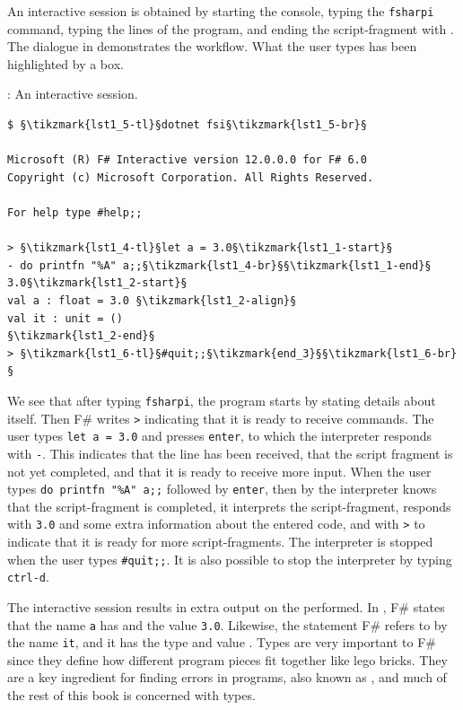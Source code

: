 \documentclass[springer.tex]{subfiles}
\begin{document}
An interactive session is obtained by starting the console, typing the \lstinline[language=console]{fsharpi} command, typing the lines of the program, and ending the script-fragment with \lexeme{;;}. The dialogue in  demonstrates the workflow. What the user types has been highlighted by a box.
%
\begin{codeNOutput}[label=interactiveSession,
  top=-5pt,
  bottom=-5pt,
  left=-2pt,
  right=-2pt,
]{: An interactive session.}
  \begin{lstlisting}[language=console,escapechar=§]
$ §\tikzmark{lst1_5-tl}§dotnet fsi§\tikzmark{lst1_5-br}§

Microsoft (R) F# Interactive version 12.0.0.0 for F# 6.0
Copyright (c) Microsoft Corporation. All Rights Reserved.

For help type #help;;

> §\tikzmark{lst1_4-tl}§let a = 3.0§\tikzmark{lst1_1-start}§
- do printfn "%A" a;;§\tikzmark{lst1_4-br}§§\tikzmark{lst1_1-end}§
3.0§\tikzmark{lst1_2-start}§
val a : float = 3.0 §\tikzmark{lst1_2-align}§
val it : unit = ()
§\tikzmark{lst1_2-end}§
> §\tikzmark{lst1_6-tl}§#quit;;§\tikzmark{end_3}§§\tikzmark{lst1_6-br}§
\end{lstlisting}%
\end{codeNOutput}%
%
%
%
%
We see that after typing \lstinline[language=console]{fsharpi}, the program starts by stating details about itself. Then F\# writes \lstinline{>} indicating that it is ready to receive commands. The user types \lstinline{let a = 3.0} and presses \lstinline[language=console]{enter}, to which the interpreter responds with \lstinline{-}. This indicates that the line has been received, that the script fragment is not yet completed, and that it is ready to receive more input. When the user types \lstinline{do printfn "%A" a;;} %
followed by \lstinline[language=console]{enter}, then by \lexeme{;;} the interpreter knows that the script-fragment is completed, it interprets the script-fragment, responds with \lstinline{3.0} and some extra information about the entered code, and with \lstinline{>} to indicate that it is ready for more script-fragments. The interpreter is stopped when the user types \lstinline[language=console]{#quit;;}. It is also possible to stop the interpreter by typing \lstinline[language=console]{ctrl-d}.

The interactive session results in extra output on the  performed. In , F\# states that the name \lstinline{a} has   and the value \lstinline{3.0}. Likewise, the  statement F\# refers to by the name \lstinline{it}, and it has the type  and value \lexeme{()}. Types are very important to F\# since they define how different program pieces fit together like lego bricks. They are a key ingredient for finding errors in programs, also known as , and much of the rest of this book is concerned with types.
\end{document}
